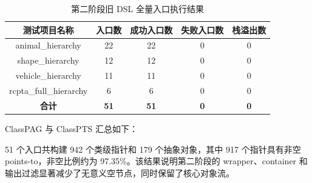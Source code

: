 \documentclass[10.5pt,compsoc,UTF8]{cjc}
\theoremstyle{mystyle}
\begin{document}
\begin{table}[H]
\centering
\begin{tabular}{|c|c|c|c|c|}
\hline
\textbf{测试项目名称} & \textbf{入口数} & \textbf{成功入口数} & \textbf{失败入口数} & \textbf{栈溢出数} \\ \hline
animal\_hierarchy & 22 & 22 & 0 & 0 \\ \hline
shape\_hierarchy & 12 & 12 & 0 & 0 \\ \hline
vehicle\_hierarchy & 11 & 11 & 0 & 0 \\ \hline
rcpta\_full\_hierarchy & 6 & 6 & 0 & 0 \\ \hline
\textbf{合计} & \textbf{51} & \textbf{51} & \textbf{0} & \textbf{0} \\ \hline
\end{tabular}
\caption{第二阶段旧 DSL 全量入口执行结果}
\label{tab:phase2_old_execution}
\end{table}

ClassPAG 与 ClassPTS 汇总如下：

\begin{table}[H]
\centering
\small
{}
\caption{第二阶段旧 DSL ClassPAG 与 ClassPTS 全量统计}
\label{tab:phase2_old_pag_pts}
\end{table}

51 个入口共构建 942 个类级指针和 179 个抽象对象，其中 917 个指针具有非空 points-to，非空比例约为 97.35\%。该结果说明第二阶段的 wrapper、container 和输出过滤显著减少了无意义空节点，同时保留了核心对象流。
\end{document}
